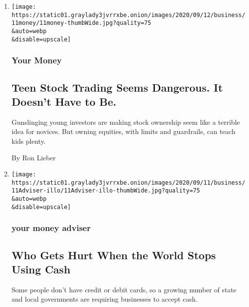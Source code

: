 \begin{enumerate}
\def\labelenumi{\arabic{enumi}.}
\item
  \href{/2020/09/12/your-money/stock-trading-robinhood-teens.html}{}

  \texttt{[image: https://static01.graylady3jvrrxbe.onion/images/2020/09/12/business/11money/11money-thumbWide.jpg?quality=75\\\&auto=webp\\\&disable=upscale]}

  \hypertarget{your-money-1}{%
  \subsubsection{Your Money}\label{your-money-1}}

  \hypertarget{teen-stock-trading-seems-dangerous-it-doesnt-have-to-be}{%
  \subsection{Teen Stock Trading Seems Dangerous. It Doesn't Have to
  Be.}\label{teen-stock-trading-seems-dangerous-it-doesnt-have-to-be}}

  Gunslinging young investors are making stock ownership seem like a
  terrible idea for novices. But owning equities, with limits and
  guardrails, can teach kids plenty.

  By Ron Lieber
\item
  \href{/2020/09/11/your-money/cash-credit-cards-coronavirus.html}{}

  \texttt{[image: https://static01.graylady3jvrrxbe.onion/images/2020/09/11/business/11Adviser-illo/11Adviser-illo-thumbWide.jpg?quality=75\\\&auto=webp\\\&disable=upscale]}

  \hypertarget{your-money-adviser}{%
  \subsubsection{your money adviser}\label{your-money-adviser}}

  \hypertarget{who-gets-hurt-when-the-world-stops-using-cash}{%
  \subsection{Who Gets Hurt When the World Stops Using
  Cash}\label{who-gets-hurt-when-the-world-stops-using-cash}}

  Some people don't have credit or debit cards, so a growing number of
  state and local governments are requiring businesses to accept cash.


\end{enumerate}
